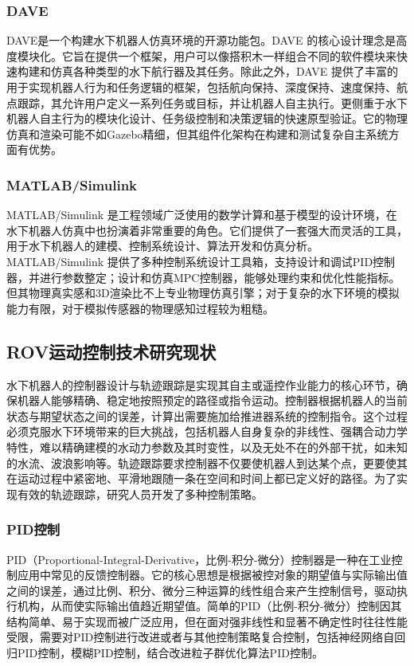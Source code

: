 \subsubsection{DAVE}

DAVE是一个构建水下机器人仿真环境的开源功能包。DAVE 的核心设计理念是高度模块化。它旨在提供一个框架，用户可以像搭积木一样组合不同的软件模块来快速构建和仿真各种类型的水下航行器及其任务。除此之外，DAVE 提供了丰富的用于实现机器人行为和任务逻辑的框架，包括航向保持、深度保持、速度保持、航点跟踪，其允许用户定义一系列任务或目标，并让机器人自主执行。更侧重于水下机器人自主行为的模块化设计、任务级控制和决策逻辑的快速原型验证。它的物理仿真和渲染可能不如Gazebo精细，但其组件化架构在构建和测试复杂自主系统方面有优势。

\subsubsection{MATLAB/Simulink}

MATLAB/Simulink 是工程领域广泛使用的数学计算和基于模型的设计环境，在水下机器人仿真中也扮演着非常重要的角色。它们提供了一套强大而灵活的工具，用于水下机器人的建模、控制系统设计、算法开发和仿真分析。MATLAB/Simulink 提供了多种控制系统设计工具箱，支持设计和调试PID控制器，并进行参数整定；设计和仿真MPC控制器，能够处理约束和优化性能指标。但其物理真实感和3D渲染比不上专业物理仿真引擎；对于复杂的水下环境的模拟能力有限，对于模拟传感器的物理感知过程较为粗糙。

\subsection{ROV运动控制技术研究现状}

水下机器人的控制器设计与轨迹跟踪是实现其自主或遥控作业能力的核心环节，确保机器人能够精确、稳定地按照预定的路径或指令运动。控制器根据机器人的当前状态与期望状态之间的误差，计算出需要施加给推进器系统的控制指令。这个过程必须克服水下环境带来的巨大挑战，包括机器人自身复杂的非线性、强耦合动力学特性，难以精确建模的水动力参数及其时变性，以及无处不在的外部干扰，如未知的水流、波浪影响等。轨迹跟踪要求控制器不仅要使机器人到达某个点，更要使其在运动过程中紧密地、平滑地跟随一条在空间和时间上都已定义好的路径。为了实现有效的轨迹跟踪，研究人员开发了多种控制策略。

\subsubsection{PID控制}

PID（Proportional-Integral-Derivative，比例-积分-微分）控制器是一种在工业控制应用中常见的反馈控制器。它的核心思想是根据被控对象的期望值与实际输出值之间的误差，通过比例、积分、微分三种运算的线性组合来产生控制信号，驱动执行机构，从而使实际输出值趋近期望值。简单的PID（比例-积分-微分）\cite{liuUnderwaterRemotelyOperated2023}控制因其结构简单、易于实现而被广泛应用\cite{zohediSYSTEMIDENTIFICATIONSI2023}，但在面对强非线性和显著不确定性时往往性能受限，需要对PID控制进行改进或者与其他控制策略复合控制，包括神经网络自回归PID控制\cite{hernandez-alvaradoNeuralNetworkBasedSelfTuning2016}，模糊PID控制\cite{dongDepthControlROV2020a}，结合改进粒子群优化算法PID控制\cite{liuUnderwaterRemotelyOperated2023a}。

